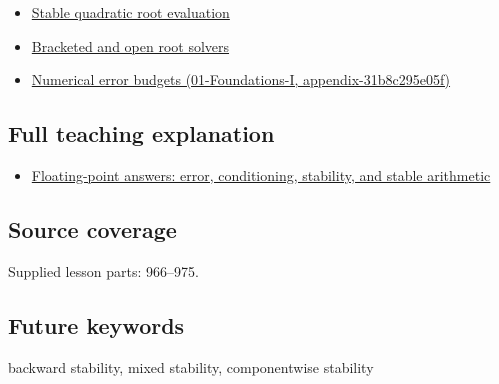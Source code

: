 \begin{itemize}
\tightlist
\item
  \hyperref[appendix-b9afba7f63e5]{Stable quadratic root evaluation}
\item
  \hyperref[appendix-f63eb850796d]{Bracketed and open root solvers}
\item
  \href{}{Numerical error budgets (01-Foundations-I, appendix-31b8c295e05f)}
\end{itemize}

\subsection{Full teaching explanation}\label{full-teaching-explanation}

\begin{itemize}
\tightlist
\item
  \href{Continuous\%20Notes/Computing\%20Foundations\%20-\%20From\%20Bits\%20to\%20C++\%20and\%20Systems\%20APIs\#Floating-point\%20answers:\%20error,\%20conditioning,\%20stability,\%20and\%20stable\%20arithmetic}{Floating-point answers: error, conditioning, stability, and stable arithmetic}
\end{itemize}

\subsection{Source coverage}\label{source-coverage}

Supplied lesson parts: 966--975.

\subsection{Future keywords}\label{future-keywords}

backward stability, mixed stability, componentwise stability
